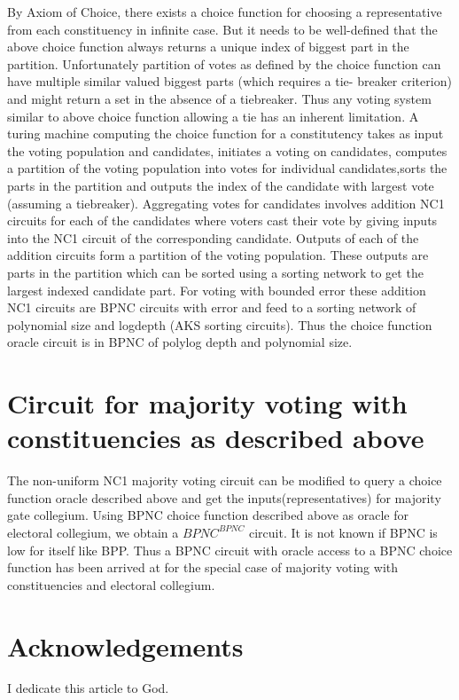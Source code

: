 \documentclass[11pt,onecolumn]{article}
\begin{document}
By Axiom of Choice, there exists a choice function for choosing a representative from each
constituency in infinite case. But it needs to be well-defined that the above choice function always
returns a unique index of biggest part in the partition. Unfortunately partition of votes as defined
by the choice function can have multiple similar valued biggest parts (which requires a tie-
breaker criterion) and might return a set in the absence of a tiebreaker. Thus any voting system
similar to above choice function allowing a tie has an inherent limitation.
A turing machine computing the choice function for a constitutency takes as input the voting
population and candidates, initiates a voting on candidates, computes a partition of the voting
population into votes for individual candidates,sorts the parts in the partition and outputs the
index of the candidate with largest vote (assuming a tiebreaker). Aggregating votes for
candidates involves addition NC1 circuits for each of the candidates where voters cast their
vote by giving inputs into the NC1 circuit of the corresponding candidate. Outputs of each of the
addition circuits form a partition of the voting population. These outputs are parts in the
partition which can be sorted using a sorting network to get the largest indexed candidate part.
For voting with bounded error these addition NC1 circuits are BPNC circuits with error and feed
to a sorting network of polynomial size and logdepth (AKS sorting circuits). Thus the choice
function oracle circuit is in BPNC of polylog depth and polynomial size.

\section{Circuit for majority voting with constituencies as described above}
The non-uniform NC1 majority voting circuit can be modified to query a choice function oracle
described above and get the inputs(representatives) for majority gate collegium. Using BPNC
choice function described above as oracle for electoral collegium, we obtain a $BPNC^{BPNC}$
circuit. It is not known if BPNC is low for itself like BPP. Thus a BPNC circuit with oracle access
to a BPNC choice function has been arrived at for the special case of majority voting with
constituencies and electoral collegium.

\section{Acknowledgements}
I dedicate this article to God.
\end{document}
